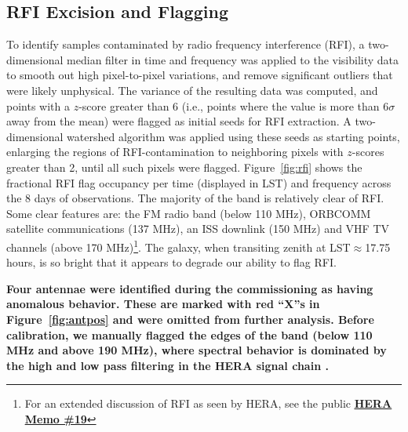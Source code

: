 \documentclass[twocolumn, trackchanges]{aastex61}
\newcommand{\edited}[1]{{\bf \color{red} #1}}
\begin{document}
\edited{\subsection{RFI Excision and Flagging}}

To identify samples contaminated by radio frequency interference (RFI), a two-dimensional median filter in time and frequency was applied to the visibility data to smooth out high pixel-to-pixel variations, and remove significant outliers that were likely unphysical. The variance of the resulting data was computed, and points with a $z$-score greater than 6 (i.e., points where the value is more than 6$\sigma$ away from the mean) were flagged as initial seeds for RFI extraction. A two-dimensional watershed algorithm was applied using these seeds as starting points, enlarging the regions of RFI-contamination to neighboring pixels with $z$-scores greater than 2, until all such pixels were flagged. Figure~\ref{fig:rfi} shows the fractional RFI flag occupancy per time (displayed in LST) and frequency across the 8 days of observations. The majority of the band is relatively clear of RFI. Some clear features are: the FM radio band (below 110 MHz), ORBCOMM satellite communications (137 MHz), an ISS downlink (150 MHz) and VHF TV channels (above 170 MHz)\footnote{For an extended discussion of RFI as seen by HERA, see the public \href{http://reionization.org/wp-content/uploads/2013/03/HERAMemo19_HERA_dish_RFI.pdf}{\edited{\underline{HERA Memo \#19}}}}.
The galaxy, when transiting zenith at LST$\approx$17.75 hours, is so bright that it appears to degrade our ability to flag RFI.

\edited{Four antennae were identified during the commissioning as having anomalous behavior. These are marked with red ``X''s in Figure~\ref{fig:antpos} and were omitted from further analysis.  Before calibration, we manually flagged the edges of the band (below 110 MHz and above 190 MHz), where spectral behavior is dominated by the high and low pass filtering in the HERA signal chain \citep{deBoer17}.}
\end{document}
